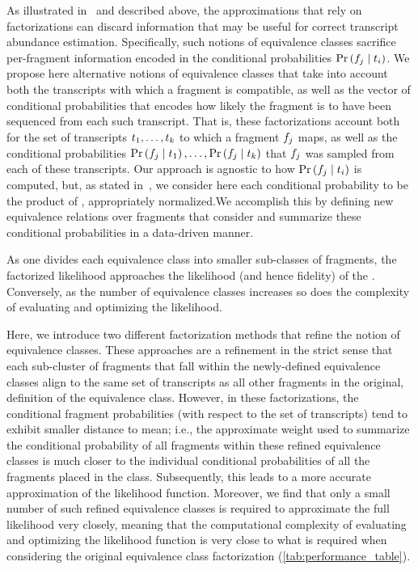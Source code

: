 As illustrated in~ and described above, the approximations
that rely on \cb factorizations can discard information that may be
useful for correct transcript abundance estimation. Specifically, such
notions of equivalence classes sacrifice per-fragment information encoded in the
conditional probabilities $\Prob{\frag{j}}{\txp{i}}$. We propose here alternative 
notions of equivalence classes that take into account both the transcripts with 
which a fragment is compatible, as well as the vector of conditional probabilities 
that encodes how likely the fragment is to have been sequenced from each such 
transcript. That is, these factorizations account both for the set of transcripts 
$t_{1}, \dots, t_{k}$ to which a fragment $f_{j}$ maps, as well as the conditional
probabilities $\Prob{\frag{j}}{\txp{1}}, \dots, \Prob{\frag{j}}{\txp{k}}$ that
$f_{j}$ was sampled from each of these transcripts. Our approach is agnostic
to how $\Prob{\frag{j}}{\txp{i}}$ is computed, but, as stated
in~, we consider here each conditional probability to be the
product of , appropriately
normalized.We accomplish this by defining new equivalence relations over
fragments that consider and summarize these conditional probabilities in a
data-driven manner.

As one divides each equivalence class into smaller sub-classes of fragments, the
factorized likelihood approaches the likelihood (and hence fidelity) of the \fm.
Conversely, as the number of equivalence classes increases so does the
complexity of evaluating and optimizing the likelihood.

Here, we introduce two different factorization methods that refine the \cb
notion of equivalence classes. These approaches are a refinement in the strict
sense that each sub-cluster of fragments that fall within the newly-defined
equivalence classes align to the same set of transcripts as all other fragments
in the original, \cb definition of the equivalence class. However, in these
factorizations, the conditional fragment probabilities (with respect to the set
of transcripts) tend to exhibit smaller distance to mean; i.e., the approximate weight
used to summarize the conditional probability of all fragments within these
refined equivalence classes is much closer to the individual conditional
probabilities of all the fragments placed in the class. Subsequently, this
leads to a more accurate approximation of the likelihood function.
Moreover, we find that only a small number of such refined equivalence classes
is required to approximate the full likelihood very closely, meaning that the
computational complexity of evaluating and optimizing the likelihood function is
very close to what is required when considering the original \cb equivalence class
factorization (\cref{tab:performance_table}).
